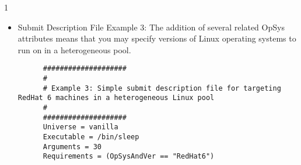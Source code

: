 \begin{ManPage}{\label{man-condor-submit}}{1}
\begin{itemize}
\footnotesize
\begin{verbatim}
      ####################                                                    
      #                                                                       
      # Example 2: Show off some fancy features including
      # use of pre-defined macros and logging.                                
      #                                                                       
      ####################                                                    
                                                                          
      Executable     = foo                                                    
      Universe       = standard
      Requirements   = Memory >= 32 && OpSys == "LINUX" && Arch =="INTEL"     
      Rank           = Memory >= 64
      Image_Size     = 28 Meg                                                 
                                                                          
      Error   = err.$(Process)                                                
      Input   = in.$(Process)                                                 
      Output  = out.$(Process)                                                
      Log = foo.log                                                                       
                                                                          
      Queue 150
\end{verbatim}
\normalsize

\item{Submit Description File Example 3:}  The addition of several related OpSys attributes means that you may specify versions of Linux operating systems to run on in a heterogeneous pool.

\footnotesize
\begin{verbatim}
      ####################                                                    
      #                                                                       
      # Example 3: Simple submit description file for targeting RedHat 6 machines in a heterogeneous Linux pool
      #                                                                       
      ####################                                                    
      Universe = vanilla
      Executable = /bin/sleep
      Arguments = 30
      Requirements = (OpSysAndVer == "RedHat6")
                                                                          

\end{verbatim}
\end{itemize}
\end{ManPage}
